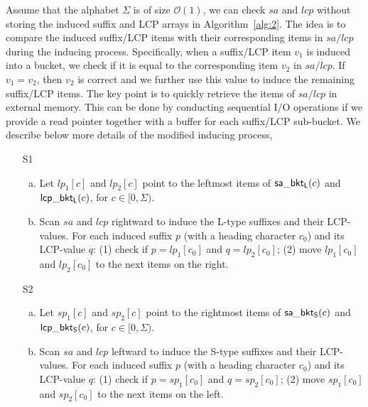 \documentclass[10pt,journal,compsoc]{IEEEtran}
\begin{document}
Assume that the alphabet $\Sigma$ is of size $\mathcal{O}(1)$, we can check $sa$ and $lcp$ without storing the induced suffix and LCP arrays in Algorithm~\ref{alg:2}. The idea is to compare the induced suffix/LCP items with their corresponding items in $sa/lcp$ during the inducing process. Specifically, when a suffix/LCP item $v_1$ is induced into a bucket, we check if it is equal to the corresponding item $v_2$ in $sa/lcp$. If $v_1 = v_2$, then $v_2$ is correct and we further use this value to induce the remaining suffix/LCP items. The key point is to quickly retrieve the items of $sa/lcp$ in external memory. This can be done by conducting sequential I/O operations if we provide a read pointer together with a buffer for each suffix/LCP sub-bucket. We describe below more details of the modified inducing process, %
{\color{red}{where $lp_1/lp_2$ and $sp_1/sp_2$ indicate the next items to be visited in the L-type and S-type sub-buckets, respectively.}}

\begin{enumerate}
	\item [S1]
	\begin{enumerate}[(a)]
		\item 
		Let $lp_1[c]$ and $lp_2[c]$ point to the leftmost items of ${\sf sa\_bkt_L}(c)$ and ${\sf lcp\_bkt_L}(c)$, for $c \in [0, \Sigma)$.
		\item 
		Scan $sa$ and $lcp$ rightward to induce the L-type suffixes and their LCP-values. For each induced suffix $p$ (with a heading character $c_0$) and its LCP-value $q$: (1) check if $p = lp_1[c_0]$ and $q = lp_2[c_0]$; (2) move $lp_1[c_0]$ and $lp_2[c_0]$ to the next items on the right.
	\end{enumerate}
	\item [S2]
	\begin{enumerate}[(a)]
		\item 	
		Let $sp_1[c]$ and $sp_2[c]$ point to the rightmost items of ${\sf sa\_bkt_S}(c)$ and ${\sf lcp\_bkt_S}(c)$, for $c \in [0, \Sigma)$.
		\item 	
		Scan $sa$ and $lcp$ leftward to induce the S-type suffixes and their LCP-values. For each induced suffix $p$ (with a heading character $c_0$) and its LCP-value $q$: (1) check if $p = sp_1[c_0]$ and $q = sp_2[c_0]$; (2) move $sp_1[c_0]$ and $sp_2[c_0]$ to the next items on the left.
	\end{enumerate}
\end{enumerate}
\end{document}
